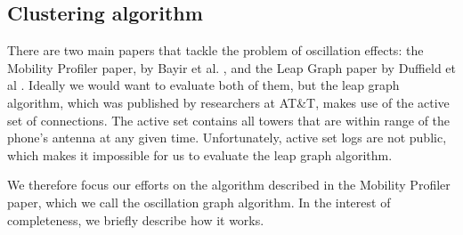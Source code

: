 \documentclass[letterpaper, 12pt, conference]{ieeeconf}
\begin{document}
\subsection{Clustering algorithm}

There are two main papers that tackle the problem of oscillation effects: the 
Mobility Profiler paper, by Bayir et al. \cite{mobilityprofiler}, and the 
Leap Graph paper by Duffield et al \cite{LeapGraph}. Ideally we would want to 
evaluate both of them, but the leap graph algorithm, which was published by 
researchers at AT\&T, makes use of the active set of connections. The active 
set contains all towers that are within range of the phone's antenna at any 
given time. Unfortunately, active set logs are not public, which makes it 
impossible for us to evaluate the leap graph algorithm.

We therefore focus our efforts on the algorithm described in the Mobility 
Profiler paper, which we call the oscillation graph algorithm. In the 
interest of completeness, we briefly describe how it works.
\end{document}
